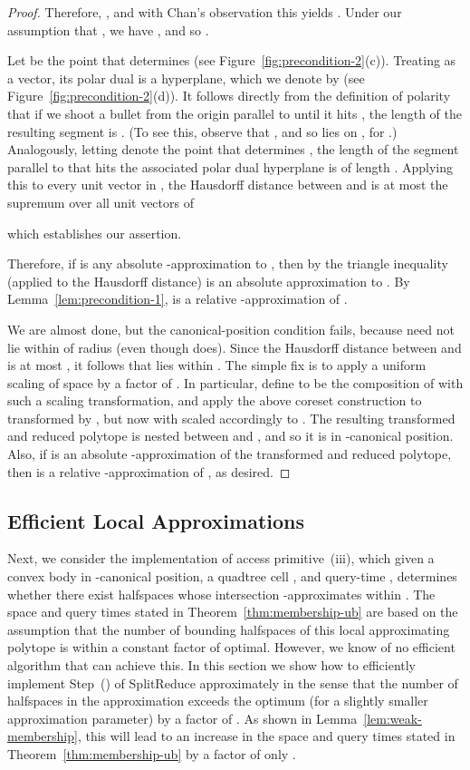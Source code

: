 \documentclass[11pt]{article}   \usepackage[letterpaper,hmargin=2.1cm,vmargin=3cm]{geometry}
\newcommand{\alg}{\textrm{SplitReduce}}
\begin{document}
\begin{proof}
Therefore, , and with Chan's observation this yields . Under our assumption that , we have , and so .

Let  be the point that determines  (see Figure~\ref{fig:precondition-2}(c)). Treating  as a vector, its polar dual is a hyperplane, which we denote by  (see Figure~\ref{fig:precondition-2}(d)). It follows directly from the definition of polarity that if we shoot a bullet from the origin parallel to  until it hits , the length of the resulting segment is . (To see this, observe that , and so  lies on , for .) Analogously, letting  denote the point that determines , the length of the segment parallel to  that hits the associated polar dual hyperplane  is of length . Applying this to every unit vector in , the Hausdorff distance between  and  is at most the supremum over all unit vectors of 

which establishes our assertion.

Therefore, if  is any absolute -approximation to , then by the triangle inequality (applied to the Hausdorff distance)  is an absolute  approximation to . By Lemma~\ref{lem:precondition-1},  is a relative -approximation of .

We are almost done, but the canonical-position condition fails, because  need not lie within  of radius  (even though  does). Since the Hausdorff distance between  and  is at most , it follows that  lies within . The simple fix is to apply a uniform scaling of space by a factor of . In particular, define  to be the composition of  with such a scaling transformation, and apply the above coreset construction to  transformed by , but now with  scaled accordingly to . The resulting transformed and reduced polytope is nested between  and , and so it is in -canonical position. Also, if  is an absolute -approximation of the transformed and reduced polytope, then  is a relative -approximation of , as desired.
\end{proof}


\subsection{Efficient Local Approximations} \label{sec:apx-cover}


Next, we consider the implementation of access primitive~(iii), which given a convex body  in -canonical position, a quadtree cell , and query-time , determines whether there exist  halfspaces whose intersection -approximates  within . The space and query times stated in Theorem~\ref{thm:membership-ub} are based on the assumption that the number of bounding halfspaces of this local approximating polytope is within a constant factor of optimal. However, we know of no efficient algorithm that can achieve this. In this section we show how to efficiently implement Step~(\stepapx) of {\alg} approximately in the sense that the number of halfspaces in the approximation exceeds the optimum (for a slightly smaller approximation parameter) by a factor of . As shown in Lemma~\ref{lem:weak-membership}, this will lead to an increase in the space and query times stated in Theorem~\ref{thm:membership-ub} by a factor of only .
\end{document}
